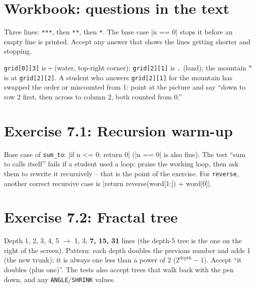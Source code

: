 
\section{Workbook: questions in the text}
\begin{answer}
Three lines: \texttt{***}, then \texttt{**}, then \texttt{*}. The base case \py|n == 0| stops it before an empty line is printed. Accept any answer that shows the lines getting shorter and stopping.
\end{answer}
\begin{answer}
\texttt{grid[0][3]} is \texttt{\textasciitilde} (water, top-right corner); \texttt{grid[2][1]} is \texttt{.} (land); the mountain \texttt{\textasciicircum} is at \texttt{grid[2][2]}. A student who answers \texttt{grid[2][1]} for the mountain has swapped the order or miscounted from 1: point at the picture and say \enquote{down to row 2 first, then across to column 2, both counted from 0.}
\end{answer}

\section{Exercise 7.1: Recursion warm-up}
\begin{answer}
Base case of \texttt{sum\_to}: \py|if n <= 0: return 0| (\py|n == 0| is also fine). The test \enquote{sum to calls itself} fails if a student used a loop: praise the working loop, then ask them to rewrite it recursively -- that is the point of the exercise. For \texttt{reverse}, another correct recursive case is \py|return reverse(word[1:]) + word[0]|.
\end{answer}

\section{Exercise 7.2: Fractal tree}
\begin{answer}
Depth 1, 2, 3, 4, 5 $\rightarrow$ 1, 3, \textbf{7, 15, 31} lines (the depth-5 tree is the one on the right of the screen). Pattern: each depth doubles the previous number and adds 1 (the new trunk); it is always one less than a power of 2 ($2^{\text{depth}} - 1$). Accept \enquote{it doubles (plus one)}. The tests also accept trees that walk back with the pen down, and any \texttt{ANGLE}/\texttt{SHRINK} values.
\end{answer}

